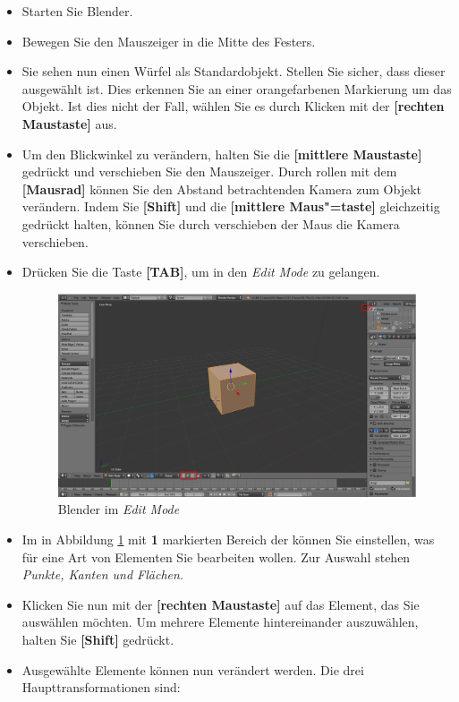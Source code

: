 \documentclass[10pt,a5paper,twoside,titlepage]{scrartcl}
\begin{document}
	\begin{itemize}
	\item Starten Sie Blender.
	\item Bewegen Sie den Mauszeiger in die Mitte des Festers.
	\item Sie sehen nun einen Würfel als Standardobjekt. Stellen Sie sicher, dass dieser ausgewählt ist. Dies erkennen Sie an einer orangefarbenen Markierung um das Objekt. Ist dies nicht der Fall, wählen Sie es durch Klicken mit der \textbf{[rechten Maustaste]} aus.
	\item Um den Blickwinkel zu verändern, halten Sie die \textbf{[mittlere Maustaste]} gedrückt und verschieben Sie den Mauszeiger. Durch rollen mit dem \textbf{[Mausrad]} können Sie den Abstand betrachtenden Kamera zum Objekt verändern. Indem Sie \textbf{[Shift]} und die \textbf{[mittlere Maus"=taste]} gleichzeitig gedrückt halten, können Sie durch verschieben der Maus die Kamera verschieben.
	\item Drücken Sie die Taste  \textbf{[TAB]}, um in den \emph{Edit Mode} zu gelangen.
	\begin{figure}
	\includegraphics[trim=0cm 0cm 0cm 0cm,clip=true,scale=.17]{Blender_006.png}
	\caption{Blender im \emph{Edit Mode}}
	\label{fig:blender_edit_mode}
	\end{figure}
	\item Im in Abbildung \ref{fig:blender_edit_mode} mit \textbf{1} markierten Bereich der können Sie einstellen, was für eine Art von Elementen Sie bearbeiten wollen. Zur Auswahl stehen \emph{Punkte, Kanten und Flächen}.
	\item Klicken Sie nun mit der \textbf{[rechten Maustaste]} auf das Element, das Sie auswählen möchten. Um mehrere Elemente hintereinander auszuwählen, halten Sie \textbf{[Shift]} gedrückt.
	\item Ausgewählte Elemente können nun verändert werden. Die drei Haupttransformationen sind:

\end{itemize}
\end{document}
